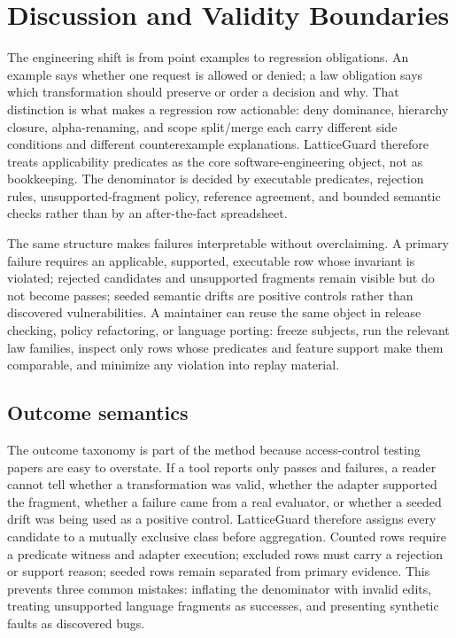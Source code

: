 \documentclass[10pt,conference]{IEEEtran}
\begin{document}
\section{Discussion and Validity Boundaries}
\label{sec:implications}
The engineering shift is from point examples to regression obligations.  An example says whether one request is allowed or denied; a law obligation says which transformation should preserve or order a decision and why.  That distinction is what makes a regression row actionable: deny dominance, hierarchy closure, alpha-renaming, and scope split/merge each carry different side conditions and different counterexample explanations.  LatticeGuard therefore treats applicability predicates as the core software-engineering object, not as bookkeeping.  The denominator is decided by executable predicates, rejection rules, unsupported-fragment policy, reference agreement, and bounded semantic checks rather than by an after-the-fact spreadsheet.

The same structure makes failures interpretable without overclaiming.  A primary failure requires an applicable, supported, executable row whose invariant is violated; rejected candidates and unsupported fragments remain visible but do not become passes; seeded semantic drifts are positive controls rather than discovered vulnerabilities.  A maintainer can reuse the same object in release checking, policy refactoring, or language porting: freeze subjects, run the relevant law families, inspect only rows whose predicates and feature support make them comparable, and minimize any violation into replay material.

\subsection{Outcome semantics}
The outcome taxonomy is part of the method because access-control testing papers are easy to overstate.  If a tool reports only passes and failures, a reader cannot tell whether a transformation was valid, whether the adapter supported the fragment, whether a failure came from a real evaluator, or whether a seeded drift was being used as a positive control.  LatticeGuard therefore assigns every candidate to a mutually exclusive class before aggregation.  Counted rows require a predicate witness and adapter execution; excluded rows must carry a rejection or support reason; seeded rows remain separated from primary evidence.  This prevents three common mistakes: inflating the denominator with invalid edits, treating unsupported language fragments as successes, and presenting synthetic faults as discovered bugs.
\end{document}
